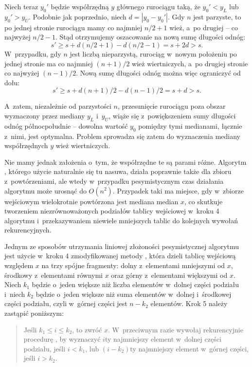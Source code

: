 Niech teraz $y_0'$ będzie współrzędną $y$ głównego rurociągu taką, że $y_0'<y_L$ lub $y_0'>y_U$.
Podobnie jak poprzednio, niech $d=|y_0-y_0'|$.
Gdy $n$ jest parzyste, to po jednej stronie rurociągu mamy co najmniej $n/2+1$ wież, a~po drugiej -- co najwyżej $n/2-1$.
Stąd otrzymujemy oszacowanie na nową sumę długości odnóg:
\[
    s' \ge s+d(n/2+1)-d(n/2-1) = s+2d > s.
\]
W~przypadku, gdy $n$ jest liczbą nieparzystą, rurociąg w~nowym położeniu po jednej stronie ma co najmniej $(n+1)/2$ wież wiertniczych, a~po drugiej stronie co najwyżej $(n-1)/2$.
Nową sumę długości odnóg można więc ograniczyć od dołu:
\[
    s' \ge s+d(n+1)/2-d(n-1)/2 = s+d > s.
\]

A~zatem, niezależnie od parzystości $n$, przesunięcie rurociągu poza obszar wyznaczony przez mediany $y_L$ i~$y_U$, wiąże się z~powiększeniem sumy długości odnóg północ\nbhyphen południe -- dowolna wartość $y_0$ pomiędzy tymi medianami, łącznie z~nimi, jest optymalna.
Problem sprowadza się zatem do wyznaczenia mediany współrzędnych $y$ wież wiertniczych.

Nie mamy jednak założenia o~tym, że współrzędne te są parami różne.
Algorytm , którego użycie naturalnie się tu nasuwa, działa poprawnie także dla zbioru z~powtórzeniami, ale wtedy w~przypadku pesymistycznym czas działania algorytmu może urosnąć do $O(n^2)$.
Przypadek taki ma miejsce, gdy w~zbiorze wejściowym wielokrotnie powtórzona jest mediana median $x$, co skutkuje tworzeniem niezrównoważonych podziałów tablicy wejściowej w~kroku 4 algorytmu i~przekazywaniem niewiele mniejszych tablic do kolejnych wywołań rekurencyjnych.

Jednym ze sposobów utrzymania liniowej złożoności pesymistycznej algorytmu  jest użycie w~kroku 4 zmodyfikowanej metody , która dzieli tablicę wejściową względem $x$ na trzy spójne fragmenty: dolny z~elementami mniejszymi od $x$, środkowy z~elementami równymi $x$ oraz górny z~elementami większymi od $x$.
Niech $k_1$ będzie o~jeden większe niż liczba elementów w~dolnej części podziału i~niech $k_2$ będzie o~jeden większe niż suma elementów w~dolnej i~środkowej części podziału, czyli w~górnej części jest $n-k_2$ elementów.
Krok 5 należy zastąpić poniższym:
\begin{quote}
	Jeśli $k_1\le i\le k_2$, to zwróć $x$.
	W~przeciwnym razie wywołaj rekurencyjnie procedurę , by wyznaczyć $i$\nbhyphen ty najmniejszy element w~dolnej części podziału, jeśli $i<k_1$, lub $(i-k_2)$\nbhyphen ty najmniejszy element w~górnej części, jeśli $i>k_2$.
\end{quote}
